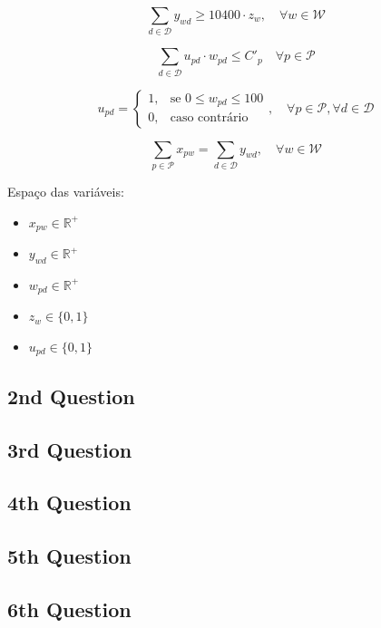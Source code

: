 \documentclass[12pt,a4paper]{article}
\begin{document}
\begin{equation} %
    \sum_{d \in \mathcal{D}} y_{wd}
    \geq 10400 \cdot z_{w}, \quad
    \forall w \in \mathcal{W}
\end{equation}


\begin{equation} %
    \sum_{d \in \mathcal{D}} u_{pd} \cdot w_{pd} \leq C'_p \quad \forall p \in \mathcal{P}
\end{equation}

\begin{equation}%
    u_{pd} =
    \begin{cases}
        1, & \text{se } 0 \leq w_{pd} \leq 100 \\
        0, & \text{caso contrário}
    \end{cases}, \quad \forall p \in \mathcal{P}, \forall d \in \mathcal{D}
\end{equation}


\begin{equation} %
    \sum_{p \in \mathcal{P}} x_{pw} =
    \sum_{d \in \mathcal{D}} y_{wd}, \quad
    \forall w \in \mathcal{W}
\end{equation}

Espaço das variáveis:

\begin{itemize}
    \item $x_{pw} \in \mathbb{R}^+$
    \item $y_{wd} \in \mathbb{R}^+$
    \item $w_{pd} \in \mathbb{R}^+$
    \item $z_{w} \in \{0, 1\}$
    \item $u_{pd} \in \{0, 1\}$
\end{itemize}




\subsection{2nd Question}
\cite{states_centers}
\cite{ballou}

\subsection{3rd Question}


\subsection{4th Question}


\subsection{5th Question}


\subsection{6th Question}



\end{document}

